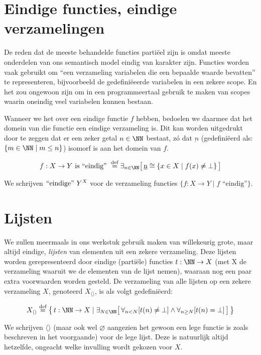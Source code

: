 \section{Eindige functies, eindige verzamelingen}

De reden dat de meeste behandelde functies partiëel zijn is omdat meeste onderdelen van ons semantisch model eindig van karakter zijn. Functies worden vaak gebruikt om ``een verzameling variabelen die een bepaalde waarde bevatten'' te representeren, bijvoorbeeld de gedefiniëeerde variabelen in een zekere scope. En het zou ongewoon zijn om in een programmeertaal gebruik te maken van scopes waarin oneindig veel variabelen kunnen bestaan.

Wanneer we het over een eindige functie $f$ hebben, bedoelen we daarmee dat het domein van die functie een eindige verzameling is. Dit kan worden uitgedrukt door te zeggen dat er een zeker getal $n \in \NN$ bestaat, zó dat $\underbar{n}$ (gedefiniëerd als: $\{m \in \NN \mid m \le n\}$) isomorf is aan het domein van $f$.

$$ f : X \to Y \text{ is ``eindig'' } \DEF \exists_{n \in \NN} \surr{ \underbar{n} \cong \{ x \in X \mid f(x) \neq \bot \} } $$

We schrijven $\text{``eindige''~}{Y}^{X}$ voor de verzameling functies $\{f : X \to Y \mid f \text{ ``eindig''} \}$.

\section{Lijsten}

We zullen meermaals in ons werkstuk gebruik maken van willekeurig grote, maar altijd eindige, \emph{lijsten} van elementen uit een zekere verzameling. Deze lijsten worden gerepresenteerd door eindige (partiële) functies $t : \NN \to X$ (met X de verzameling waaruit we de elementen van de lijst nemen), waaraan nog een paar extra voorwaarden worden gesteld. De verzameling van alle lijsten op een zekere verzameling $X$, genoteerd $X_{\langle\rangle}$, is als volgt gedefiniëerd:

$$ X_{\langle\rangle} \DEF \big\{\, t : \NN \to X \mid \exists_{N \in \NN} \surr{ \forall_{n < N}[t(n) \neq \bot] \land \forall_{n\ge N}[t(n) = \bot] } \,\big\} $$

We schrijven $\langle\rangle$ (maar ook wel $\varnothing$ aangezien het gewoon een lege functie is zoals beschreven in het voorgaande) voor de lege lijst. Deze is natuurlijk altijd hetzelfde, ongeacht welke invulling wordt gekozen voor $X$.

